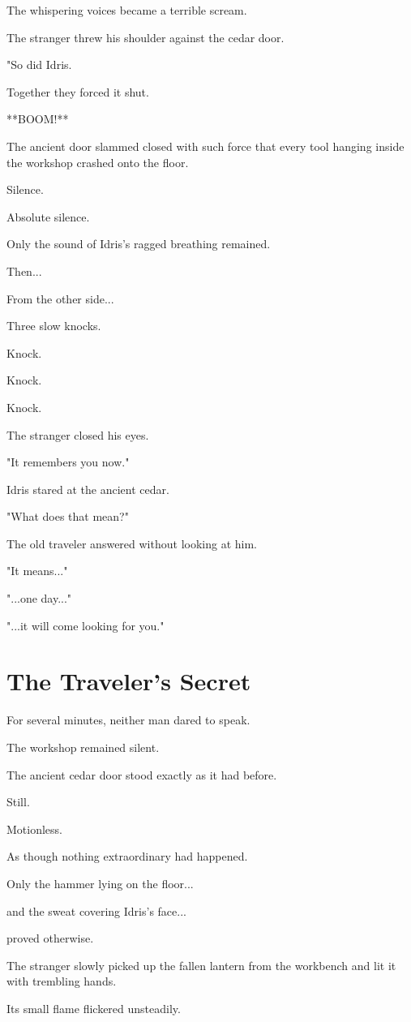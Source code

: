 \documentclass[12pt,openany]{book}
\begin{document}
The whispering voices became a terrible scream.

The stranger threw his shoulder against the cedar door.

"So did Idris.

Together they forced it shut.

**BOOM!**

The ancient door slammed closed with such force that every tool hanging inside the workshop crashed onto the floor.

Silence.

Absolute silence.

Only the sound of Idris's ragged breathing remained.

Then...

From the other side...

Three slow knocks.

Knock.

Knock.

Knock.

The stranger closed his eyes.

"It remembers you now."

Idris stared at the ancient cedar.

"What does that mean?"

The old traveler answered without looking at him.

"It means..."

"...one day..."

"...it will come looking for you."
\section*{The Traveler's Secret}

For several minutes, neither man dared to speak.

The workshop remained silent.

The ancient cedar door stood exactly as it had before.

Still.

Motionless.

As though nothing extraordinary had happened.

Only the hammer lying on the floor...

and the sweat covering Idris's face...

proved otherwise.

The stranger slowly picked up the fallen lantern from the workbench and lit it with trembling hands.

Its small flame flickered unsteadily.
\end{document}
